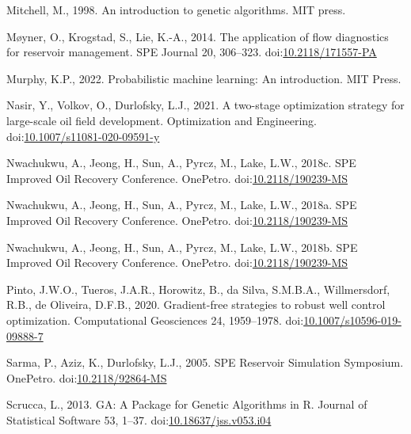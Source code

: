 \documentclass[]{elsarticle} %
\newlength{\cslhangindent}
\newenvironment{CSLReferences}[2] %
 {%
  \setlength{\parindent}{0pt}
  \ifodd #1 \everypar{\setlength{\hangindent}{\cslhangindent}}\ignorespaces\fi
  \ifnum #2 > 0
  \setlength{\parskip}{#2\baselineskip}
  \fi
 }%
 {}
\begin{document}
\begin{CSLReferences}{1}{0}
\leavevmode{}%
Mitchell, M., 1998. An introduction to genetic algorithms. MIT press.

\leavevmode{}%
Møyner, O., Krogstad, S., Lie, K.-A., 2014. The application of flow diagnostics for reservoir management. SPE Journal 20, 306--323. doi:\href{https://doi.org/10.2118/171557-PA}{10.2118/171557-PA}

\leavevmode{}%
Murphy, K.P., 2022. Probabilistic machine learning: An introduction. MIT Press.

\leavevmode{}%
Nasir, Y., Volkov, O., Durlofsky, L.J., 2021. A two-stage optimization strategy for large-scale oil field development. Optimization and Engineering. doi:\href{https://doi.org/10.1007/s11081-020-09591-y}{10.1007/s11081-020-09591-y}

\leavevmode{}%
Nwachukwu, A., Jeong, H., Sun, A., Pyrcz, M., Lake, L.W., 2018c. SPE Improved Oil Recovery Conference. OnePetro. doi:\href{https://doi.org/10.2118/190239-MS}{10.2118/190239-MS}

\leavevmode{}%
Nwachukwu, A., Jeong, H., Sun, A., Pyrcz, M., Lake, L.W., 2018a. SPE Improved Oil Recovery Conference. OnePetro. doi:\href{https://doi.org/10.2118/190239-MS}{10.2118/190239-MS}

\leavevmode{}%
Nwachukwu, A., Jeong, H., Sun, A., Pyrcz, M., Lake, L.W., 2018b. SPE Improved Oil Recovery Conference. OnePetro. doi:\href{https://doi.org/10.2118/190239-MS}{10.2118/190239-MS}

\leavevmode{}%
Pinto, J.W.O., Tueros, J.A.R., Horowitz, B., da Silva, S.M.B.A., Willmersdorf, R.B., de Oliveira, D.F.B., 2020. Gradient-free strategies to robust well control optimization. Computational Geosciences 24, 1959--1978. doi:\href{https://doi.org/10.1007/s10596-019-09888-7}{10.1007/s10596-019-09888-7}

\leavevmode{}%
Sarma, P., Aziz, K., Durlofsky, L.J., 2005. SPE Reservoir Simulation Symposium. OnePetro. doi:\href{https://doi.org/10.2118/92864-MS}{10.2118/92864-MS}

\leavevmode{}%
Scrucca, L., 2013. GA: A Package for Genetic Algorithms in R. Journal of Statistical Software 53, 1--37. doi:\href{https://doi.org/10.18637/jss.v053.i04}{10.18637/jss.v053.i04}


\end{CSLReferences}
\end{document}
